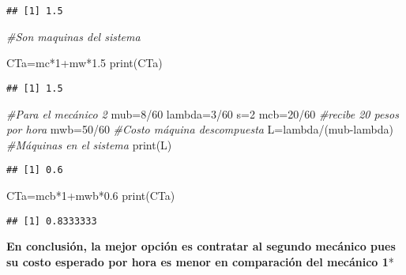 \documentclass[
]{article}
\newenvironment{Shaded}{\begin{snugshade}}{\end{snugshade}}
\newcommand{\CommentTok}[1]{\textcolor[rgb]{0.56,0.35,0.01}{\textit{#1}}}
\newcommand{\DecValTok}[1]{\textcolor[rgb]{0.00,0.00,0.81}{#1}}
\newcommand{\FloatTok}[1]{\textcolor[rgb]{0.00,0.00,0.81}{#1}}
\newcommand{\FunctionTok}[1]{\textcolor[rgb]{0.00,0.00,0.00}{#1}}
\newcommand{\NormalTok}[1]{#1}
\newcommand{\OtherTok}[1]{\textcolor[rgb]{0.56,0.35,0.01}{#1}}
\newcommand{\SpecialCharTok}[1]{\textcolor[rgb]{0.00,0.00,0.00}{#1}}
\begin{document}
\begin{verbatim}
## [1] 1.5
\end{verbatim}

\begin{Shaded}
\begin{Highlighting}[]
\CommentTok{\#Son maquinas del sistema}
\end{Highlighting}
\end{Shaded}

\begin{Shaded}
\begin{Highlighting}[]
\NormalTok{CTa}\OtherTok{=}\NormalTok{mc}\SpecialCharTok{*}\DecValTok{1}\SpecialCharTok{+}\NormalTok{mw}\SpecialCharTok{*}\FloatTok{1.5}
\FunctionTok{print}\NormalTok{(CTa)}
\end{Highlighting}
\end{Shaded}

\begin{verbatim}
## [1] 1.5
\end{verbatim}

\begin{Shaded}
\begin{Highlighting}[]
\CommentTok{\#Para el mecánico 2}
\NormalTok{mub}\OtherTok{=}\DecValTok{8}\SpecialCharTok{/}\DecValTok{60}
\NormalTok{lambda}\OtherTok{=}\DecValTok{3}\SpecialCharTok{/}\DecValTok{60}
\NormalTok{s}\OtherTok{=}\DecValTok{2}
\NormalTok{mcb}\OtherTok{=}\DecValTok{20}\SpecialCharTok{/}\DecValTok{60} \CommentTok{\#recibe 20 pesos por hora}
\NormalTok{mwb}\OtherTok{=}\DecValTok{50}\SpecialCharTok{/}\DecValTok{60}  \CommentTok{\#Costo máquina descompuesta}
\NormalTok{L}\OtherTok{=}\NormalTok{lambda}\SpecialCharTok{/}\NormalTok{(mub}\SpecialCharTok{{-}}\NormalTok{lambda)}
\CommentTok{\#Máquinas en el sistema}
\FunctionTok{print}\NormalTok{(L)}
\end{Highlighting}
\end{Shaded}

\begin{verbatim}
## [1] 0.6
\end{verbatim}

\begin{Shaded}
\begin{Highlighting}[]
\NormalTok{CTa}\OtherTok{=}\NormalTok{mcb}\SpecialCharTok{*}\DecValTok{1}\SpecialCharTok{+}\NormalTok{mwb}\SpecialCharTok{*}\FloatTok{0.6}
\FunctionTok{print}\NormalTok{(CTa)}
\end{Highlighting}
\end{Shaded}

\begin{verbatim}
## [1] 0.8333333
\end{verbatim}

\textbf{En conclusión, la mejor opción es contratar al segundo mecánico
pues su costo esperado por hora es menor en comparación del mecánico 1}*
\end{document}
